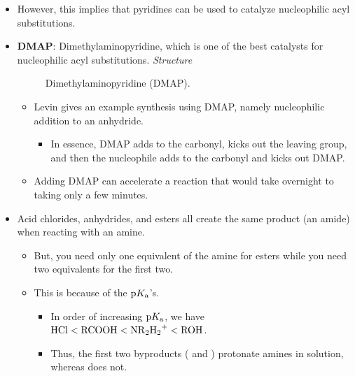 \documentclass[../notes.tex]{subfiles}
\begin{document}
\begin{itemize}
\begin{itemize}
\begin{itemize}
        \end{itemize}
    \end{itemize}
    \item However, this implies that pyridines can be used to catalyze nucleophilic acyl substitutions.
    \item \textbf{DMAP}: Dimethylaminopyridine, which is one of the best catalysts for nucleophilic acyl substitutions. \emph{Structure}
    \begin{figure}[h!]
        \centering
        \footnotesize
        \caption{Dimethylaminopyridine (DMAP).}
        \label{fig:DMAP}
    \end{figure}
    \begin{itemize}
        \item Levin gives an example synthesis using DMAP, namely nucleophilic addition to an anhydride.
        \begin{itemize}
            \item In essence, DMAP adds to the carbonyl, kicks out the leaving group, and then the nucleophile adds to the carbonyl and kicks out DMAP.
        \end{itemize}
        \item Adding DMAP can accelerate a reaction that would take overnight to taking only a few minutes.
    \end{itemize}
    \item Acid chlorides, anhydrides, and esters all create the same product (an amide) when reacting with an amine.
    \begin{itemize}
        \item But, you need only one equivalent of the amine for esters while you need two equivalents for the first two.
        \item This is because of the $\text{p}K_\text{a}$'s.
        \begin{itemize}
            \item In order of increasing $\text{p}K_\text{a}$, we have $\ce{HCl}<\ce{RCOOH}<\ce{NR2H2+}<\ce{ROH}$.
            \item Thus, the first two byproducts ( and ) protonate amines in solution, whereas  does not.
        \end{itemize}
    \end{itemize}
\end{itemize}
\end{document}
